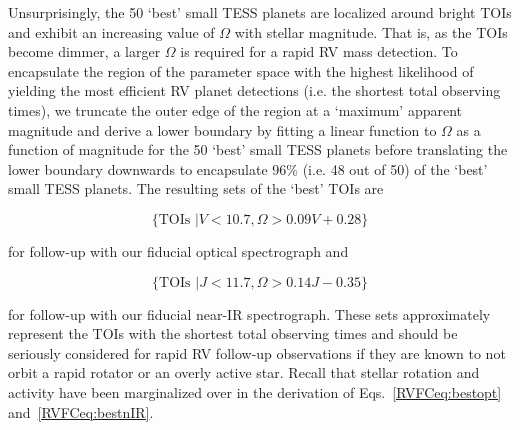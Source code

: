 Unsurprisingly, the 50 `best' small TESS planets are localized around bright TOIs and
exhibit an increasing value of $\Omega$ with stellar magnitude. That is, as the TOIs become dimmer,
a larger $\Omega$ is required for a rapid RV mass detection. To encapsulate the region of the parameter space
with the highest likelihood of yielding the most efficient RV planet detections (i.e. the shortest total
observing times), we truncate the outer edge of the
region at a `maximum' apparent magnitude and derive a lower boundary by fitting a linear function to 
$\Omega$ as a function of magnitude for the 
50 `best' small TESS planets before translating the lower boundary downwards to encapsulate 96\%
(i.e. 48 out of 50) of the `best' small TESS planets. The resulting sets of the `best' TOIs are 

\begin{equation}
  \{ \text{TOIs } | V < 10.7, \Omega > 0.09 V + 0.28 \}
  \label{RVFCeq:bestopt}
\end{equation}

\noindent for follow-up with our fiducial optical spectrograph and 

\begin{equation}
  \{ \text{TOIs } | J < 11.7, \Omega > 0.14 J - 0.35 \}
  \label{RVFCeq:bestnIR}
\end{equation}

\noindent for follow-up with our fiducial near-IR spectrograph. These sets approximately represent the TOIs with
the shortest total observing times and should be seriously considered for rapid RV follow-up observations
if they are known to not orbit a rapid rotator or an overly active star.
Recall that stellar rotation and activity have been marginalized over in the derivation of
Eqs.~\ref{RVFCeq:bestopt} and~\ref{RVFCeq:bestnIR}.

